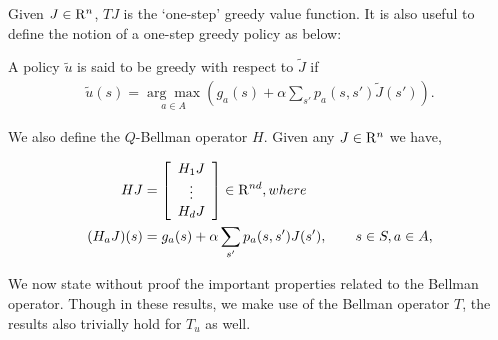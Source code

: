 Given $J \in \mathrm{R}^n$, $TJ$ is the `one-step' greedy value function. It is also useful to define the notion of a one-step greedy policy as below:
\begin{definition}
A policy $\tilde{u}$ is said to be greedy with respect to $\tilde{J}$ if
\begin{align}\label{subpol}
\tilde{u}(s)=\underset{a \in A}{\arg\max}(g_a(s)+\alpha\sum_{s'} p_a(s,s')\tilde{J}(s')).
\end{align}
\end{definition}
\begin{definition}
We also define the $Q$-Bellman operator \cite{BertB} $H$. Given any $J\in \mathrm{R}^n$ we have,

\begin{align}
HJ&=\left[ {\begin{array}{c} H_1 J  \\ \vdots \\ H_d J\end{array}} \right]\in \mathrm{R}^{nd},\relax{where}\nonumber\\
(H_a J)(s)&= g_a(s)+\alpha \sum_{s'}p_a(s,s') J(s'), \qquad s\in S, a\in A,
\end{align}
\end{definition}
 We now state without proof the important properties related to the Bellman operator. Though in these results, we make use of the Bellman operator $T$, the results also trivially hold for $T_u$ as well.
